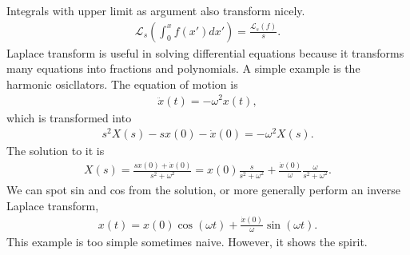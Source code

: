 \documentclass[letterpaper,10pt,english]{sphinxmanual}
\begin{document}
Integrals with upper limit as argument also transform nicely.
\begin{equation*}
\begin{split}\mathcal L_s \left( \int_0^x f(x') dx'  \right) = \frac{\mathcal L_s(f)}{s}.\end{split}
\end{equation*}
Laplace transform is useful in solving differential equations because it transforms many equations into fractions and polynomials. A simple example is the harmonic osicllators. The equation of motion is
\begin{equation*}
\begin{split}\ddot x(t) = - \omega^2 x(t),\end{split}
\end{equation*}
which is transformed into
\begin{equation*}
\begin{split}s^2 X(s) - s x(0) - \dot x(0) = - \omega^2 X(s).\end{split}
\end{equation*}
The solution to it is
\begin{equation*}
\begin{split}X(s) = \frac{ s x(0) + \dot x(0)}{s^2 + \omega^2} = x(0)\frac{ s }{s^2 + \omega^2} + \frac{\dot x(0)}{\omega} \frac{\omega}{s^2 + \omega^2}.\end{split}
\end{equation*}
We can spot sin and cos from the solution, or more generally perform an inverse Laplace transform,
\begin{equation*}
\begin{split}x(t) = x(0) \cos(\omega t) + \frac{\dot x(0)}{\omega} \sin(\omega t).\end{split}
\end{equation*}
This example is too simple sometimes naive. However, it shows the spirit.
\end{document}

